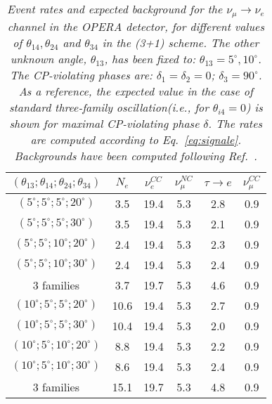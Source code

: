 \documentclass[preview]{standalone}
\begin{document}
\begin{table}[t] \centering
    \begin{tabular}{|c|c|c|c|c|c|}
	\hline\hline
	$(\theta_{13}; \theta_{14}; \theta_{24}; \theta_{34})$ & $N_e$ & $\nu_e^{CC}$ & $\nu_\mu^{NC}$ & $\tau \to e$ & $\nu_\mu^{CC}$  \\ \hline
	$(5^\circ; 5^\circ; 5^\circ; 20^\circ)$   &  3.5 & 19.4 & 5.3 & 2.8 & 0.9 \\
	$(5^\circ; 5^\circ; 5^\circ; 30^\circ)$   &  3.5 & 19.4 & 5.3 & 2.1 & 0.9 \\
	$(5^\circ; 5^\circ; 10^\circ; 20^\circ)$  &  2.4 & 19.4 & 5.3 & 2.3 & 0.9 \\
	$(5^\circ; 5^\circ; 10^\circ; 30^\circ)$  &  2.4 & 19.4 & 5.3 & 2.4 & 0.9 \\
	3 families                        &  3.7 & 19.7 & 5.3 & 4.6 & 0.9 \\
	\hline
	$(10^\circ; 5^\circ; 5^\circ; 20^\circ)$  & 10.6 & 19.4 & 5.3 & 2.7 & 0.9 \\
	$(10^\circ; 5^\circ; 5^\circ; 30^\circ)$  & 10.4 & 19.4 & 5.3 & 2.0 & 0.9 \\
	$(10^\circ; 5^\circ; 10^\circ; 20^\circ)$ &  8.8 & 19.4 & 5.3 & 2.2 & 0.9 \\
	$(10^\circ; 5^\circ; 10^\circ; 30^\circ)$ &  8.6 & 19.4 & 5.3 & 2.4 & 0.9 \\
	3 families                        & 15.1 & 19.7 & 5.3 & 4.8 & 0.9 \\
	\hline \hline
    \end{tabular}
    \caption{\label{tab:rates2}\sl%
      Event rates and expected background for the $\nu_\mu \to \nu_e$
      channel in the OPERA detector, for different values of 
      $\theta_{14}, \theta_{24}$ and $\theta_{34}$ in the (3+1)
      scheme. The other unknown angle, $\theta_{13}$, has been fixed
      to: $\theta_{13} = 5^\circ, 10^\circ$. The CP-violating phases
      are: $\delta_1 = \delta_2 = 0$; $\delta_3 = 90^\circ$.  As a
      reference, the expected value in the case of standard
      three-family oscillation(\textit{i.e.}, for $\theta_{i4} = 0$) is shown
      for maximal CP-violating phase $\delta$.  The rates are computed
      according to Eq.~\eqref{eq:signale}. Backgrounds have been
      computed following Ref.~\cite{Komatsu:2002sz}.}
\end{table}
\end{document}
